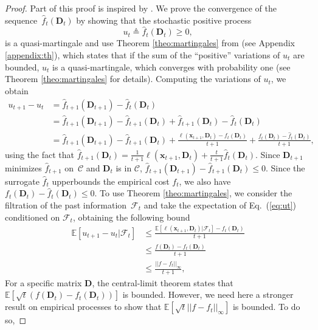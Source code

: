 \documentclass[twoside,11pt]{article}
\def\x{{\mathbf x}}
\def\l{{\ell}}
\def\hatf{{ \hat f}}
\def\D{{\mathbf D}}
\def\E{{\mathbb E}}
\def\C{{\mathcal C}}
\def\hatf{{ \hat f}}
\def\FF{{\mathcal F}}
\def\defin{\stackrel{\vartriangle}{=}}
\begin{document}
\begin{proof}
Part of this proof is inspired by \citet{bottou2}.
We prove the convergence of the sequence~$\hatf_t(\D_t)$ by
showing that the stochastic positive process
\begin{displaymath}
   u_t \defin \hatf_t(\D_t) \geq 0,
\end{displaymath}
is a quasi-martingale and use Theorem \ref{theo:martingales} from \citet{fisk} (see Appendix \ref{appendix:th}),
which states that if the sum of the ``positive'' variations of $u_t$ are
bounded, $u_t$ is a quasi-martingale, which converges with
probability one (see Theorem \ref{theo:martingales} for details).  Computing the variations of $u_t$, we obtain
\begin{equation}
   \begin{split}
      u_{t+1}-u_t &= \hatf_{t+1}(\D_{t+1}) - \hatf_t(\D_t) \\
      &= \hatf_{t+1}(\D_{t+1}) - \hatf_{t+1}(\D_{t})  + \hatf_{t+1}(\D_t)-
      \hatf_t(\D_t) \\
      &= \hatf_{t+1}(\D_{t+1}) - \hatf_{t+1}(\D_{t})  +
      \frac{\l(\x_{t+1},\D_t)-f_t(\D_t)}{t+1} + \frac{f_t(\D_t) -
      \hatf_t(\D_t)}{t+1}, \label{eq:ut}
   \end{split}
\end{equation}
using the fact that $\hatf_{t+1}(\D_t) = \frac{1}{t+1}\l(\x_{t+1},\D_t) + \frac{t}{t+1}\hatf_t(\D_t)$.
Since $\D_{t+1}$ minimizes $\hatf_{t+1}$ on~$\C$ and $\D_t$ is in $\C$,
$\hatf_{t+1}(\D_{t+1}) - \hatf_{t+1}(\D_{t}) \leq 0$.
Since the surrogate $\hatf_t$ upperbounds the empirical cost $f_t$,
we also have $f_t(\D_t) -\hatf_t(\D_t) \leq 0$.
To use Theorem \ref{theo:martingales}, we consider the filtration of
the past information~$\FF_t$ and take the expectation
of Eq.~(\ref{eq:ut}) conditioned on $\FF_t$, obtaining the following bound
\begin{displaymath}
   \begin{split}
      \E[u_{t+1}-u_t | \FF_t] & \leq
      \frac{\E[\l(\x_{t+1},\D_t)|\FF_t] -f_t(\D_t)}{t+1} \\ & \leq
      \frac{f(\D_t) -f_t(\D_t)}{t+1} \\
      &\leq \frac{||f-f_t||_\infty}{t+1},  
   \end{split}
\end{displaymath}
For a specific matrix $\D$, the central-limit theorem states that 
$\E[\sqrt{t}(f(\D_t) -f_t(\D_t))]$ is bounded.
However, we need here a stronger result on empirical processes to show that
$\E[\sqrt{t}||f-f_t||_\infty]$ is bounded. To do so,

\end{proof}
\end{document}

